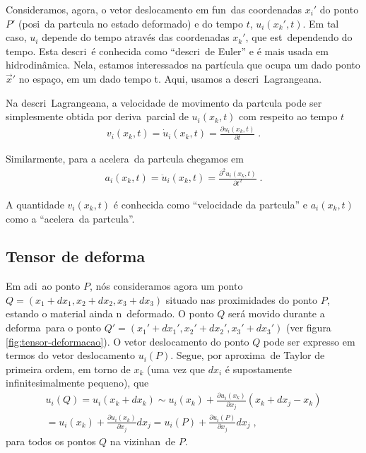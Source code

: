 Consideramos, agora, o vetor deslocamento em fun\cao\
das coordenadas $x_i'$ do ponto $P'$ (posi\cao\ da
part\ih cula no estado deformado) e do tempo $t$,
$u_i(x_k',t)$. Em tal caso, $u_i$ depende do tempo
atrav\'es das coordenadas $x_k'$, que est\ao\ dependendo do tempo. Esta
descri\cao\ \'e conhecida como
``descri\cao\ de Euler'' e \'e mais usada em
hidrodin\^amica. Nela, estamos interessados na part\'icula que
ocupa um dado ponto $\vec{x}'$ no espa\c{c}o, em um dado tempo t.
Aqui, usamos a descri\cao\ Lagrangeana.

Na descri\cao\ Lagrangeana, a velocidade de movimento da
part\ih cula pode ser simplesmente obtida por deriva\cao\
parcial de $u_i(x_k,t)$ com respeito ao tempo $t$
\begin{eqnarray}
v_i(x_k,t) = \dot{u}_i(x_k,t) = \frac{\partial u_i(x_k,t)}
{\partial t} \; .
\end{eqnarray}

Similarmente, para a acelera\cao\ da part\ih cula chegamos em
\begin{eqnarray}
a_i(x_k,t) = \ddot{u}_i(x_k,t) = \frac{\partial^2 u_i(x_k,t)}
{\partial t^2} \; .
\end{eqnarray}

A quantidade $v_i(x_k,t)$ \'e conhecida como ``velocidade
da part\ih cula'' e $a_i(x_k,t)$ como a ``acelera\cao\ da
part\ih cula''.


\subsection{Tensor de deforma\cao}

Em adi\cao{} ponto $P$, n\'os consideramos agora um ponto
$Q=(x_1+dx_1,x_2+dx_2,x_3+dx_3)$ situado nas proximidades do
ponto $P$, estando o material ainda n\ao\ deformado. O
ponto $Q$ ser\'a movido durante a deforma\cao\ para o ponto
$Q'=(x_1'+dx_1',x_2'+dx_2',x_3'+dx_3')$ (ver figura \ref{fig:tensor-deformacao}). O vetor
deslocamento do ponto $Q$ pode ser expresso em termos do
vetor deslocamento $u_i(P)$. Segue, por aproxima\cao\ de Taylor de
primeira ordem, em torno de $x_k$ (uma vez que $dx_i$ \'e supostamente infinitesimalmente
pequeno), que
\begin{eqnarray} \label{vdq}
u_i(Q) = u_i(x_k+dx_k) \sim u_i(x_k) +
\frac{\partial u_i(x_k)}
{\partial x_j} (x_k + dx_j - x_k) \nonumber \\
 = u_i(x_k) +\frac{\partial u_i(x_k)}
{\partial x_j} dx_j = u_i(P) + \frac{\partial u_i(P)}
{\partial x_j} dx_j \; ,
\end{eqnarray}
para todos os pontos $Q$ na vizinhan\ca\ de $P$.

